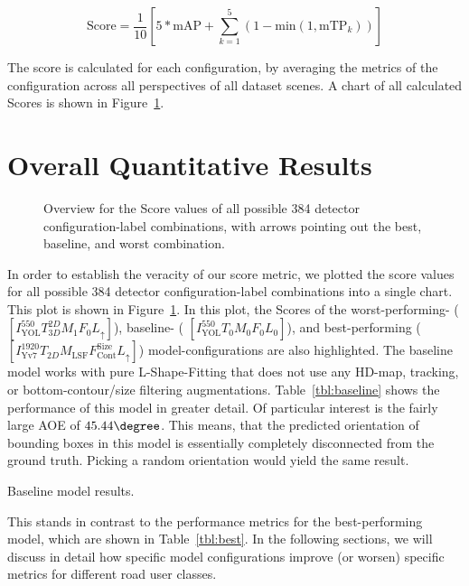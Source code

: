 \[
    \text{Score} = \frac{1}{10} \left[5 * \text{mAP} + \sum^5_{k=1}(1-\text{min}(1, \text{mTP}_k))\right]
\]

The score is calculated for each configuration, by averaging the metrics of the configuration across all perspectives of all dataset scenes.
A chart of all calculated Scores is shown in Figure~\ref{fig:all-scores}.


\section{Overall Quantitative Results}
\label{sec:baseline}

\begin{figure}[htb]
    
    \caption{Overview for the Score values of all possible 384 detector configuration-label combinations, with arrows pointing out the best, baseline, and worst combination.}
    \label{fig:all-scores}
\end{figure}

In order to establish the veracity of our score metric, we plotted the score values for all possible 384 detector configuration-label combinations into a single chart.
This plot is shown in Figure~\ref{fig:all-scores}.
In this plot, the Scores of the worst-performing- ($\left[I^{550}_\text{YOL}T^{2D}_{3D}M_1F_0L_{\uparrow}\right]$), baseline- ( $\left[I^{550}_\text{YOL}T_0M_0F_0L_0\right]$), and best-performing ($\left[I^{1920}_\text{Yv7}T_{2D}M_\text{LSF}F_\text{Cont}^\text{Size}L_{\uparrow}\right]$) model-configurations are also highlighted.
The baseline model works with pure L-Shape-Fitting that does not use any HD-map, tracking, or bottom-contour/size filtering augmentations.
Table~\ref{tbl:baseline} shows the performance of this model in greater detail.
Of particular interest is the fairly large AOE of $45.44\degree$.
This means, that the predicted orientation of bounding boxes in this model is essentially completely disconnected from the ground truth.
Picking a random orientation would yield the same result.

\begin{table}[htbp]
    
    \caption{Baseline model results.}
    \label{tbl:baseline}
\end{table}

This stands in contrast to the performance metrics for the best-performing model, which are shown in Table~\ref{tbl:best}.
In the following sections, we will discuss in detail how specific model configurations improve (or worsen) specific metrics for different road user classes.

